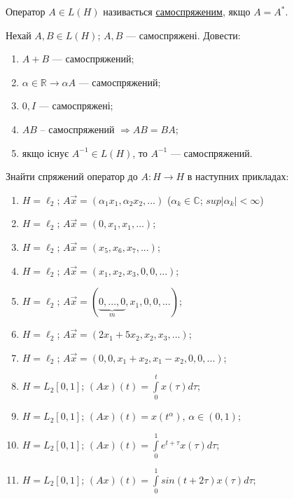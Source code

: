 \begin{theory}
    Оператор $A \in L(H)$ називається \uline{самоспряженим}, якщо 
    $A = A^*$.
\end{theory}

\begin{exercise}
    Нехай $A, B \in L(H)$; $A, B$ --- самоспряжені. Довести:
    \begin{enumerate}[label=\ukr*)]
        \item $A+B$ --- самоспряжений;
        \item $\alpha \in \mathbb{R} \rightarrow \alpha A $ 
        --- самоспряжений;
        \item $0, I$ --- самоспряжені;
        \item $AB$ -- самоспряжений $\Rightarrow AB = BA$;
        \item якщо існує $A^{-1} \in L(H)$, то $A^{-1}$ --- 
        самоспряжений.
    \end{enumerate}
\end{exercise}

\begin{exercise}
    Знайти спряжений оператор до $A: H\rightarrow H$ в наступних 
    прикладах:
    \begin{enumerate}[label=\ukr*)]
        \item $H = \ell_2$; $A\vec{x} = (\alpha_1x_1, \alpha_2x_2, ...)$
        ($\alpha_k \in \mathbb{C}$; $sup|\alpha_k| < \infty$)
        \item $H = \ell_2$; $A\vec{x} = (0, x_1, x_1, ...)$;
        \item $H = \ell_2$; $A\vec{x} = (x_5, x_6, x_7, ...)$;
        \item $H = \ell_2$; $A\vec{x} = (x_1, x_2, x_3,0,0,...)$;
        \item $H = \ell_2$; $A\vec{x} = (\underbrace{0,...,0}_m, 
        x_1, 0, 0, ...)$;
        \item $H = \ell_2$; $A\vec{x} = (2x_1 + 5x_2, x_2, x_3, ...)$;
        \item $H = \ell_2$; $A\vec{x} = (0, 0, x_1 + x_2, x_1 - x_2, 0,  
        0, ...)$;
        \item $H = L_2[0,1]$; $(Ax)(t) = \int\limits_0^t x(\tau) d\tau$;
        \item $H = L_2[0,1]$; $(Ax)(t) = x(t^\alpha)$, $\alpha \in (0,1)$;
        \item $H = L_2[0,1]$; $(Ax)(t) = \int\limits_0^1 e^{t+\tau}x(\tau) 
        d\tau$;
        \item $H = L_2[0,1]$; $(Ax)(t) = \int\limits_0^1 
        sin(t+2\tau) x(\tau) d\tau$;
    \end{enumerate}
\end{exercise}